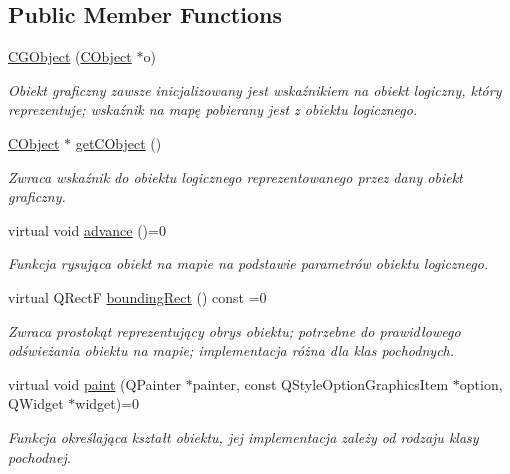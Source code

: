 \subsection*{Public Member Functions}
\begin{DoxyCompactItemize}
\item 
\mbox{\hyperlink{class_c_g_object_a40a7f41342b3b791a8854b3397378d5d}{C\+G\+Object}} (\mbox{\hyperlink{class_c_object}{C\+Object}} $\ast$o)
\begin{DoxyCompactList}\small\item\em Obiekt graficzny zawsze inicjalizowany jest wskaźnikiem na obiekt logiczny, który reprezentuje; wskaźnik na mapę pobierany jest z obiektu logicznego. \end{DoxyCompactList}\item 
\mbox{\hyperlink{class_c_object}{C\+Object}} $\ast$ \mbox{\hyperlink{class_c_g_object_a6e749272ebf5a43d43927cdfed21c46c}{get\+C\+Object}} ()
\begin{DoxyCompactList}\small\item\em Zwraca wskaźnik do obiektu logicznego reprezentowanego przez dany obiekt graficzny. \end{DoxyCompactList}\item 
virtual void \mbox{\hyperlink{class_c_g_object_a859e765fbb3ab0d6ad73ca58e5e49779}{advance}} ()=0
\begin{DoxyCompactList}\small\item\em Funkcja rysująca obiekt na mapie na podstawie parametrów obiektu logicznego. \end{DoxyCompactList}\item 
virtual Q\+RectF \mbox{\hyperlink{class_c_g_object_ab9edf3d10a53c254cdb5d3d8de930207}{bounding\+Rect}} () const =0
\begin{DoxyCompactList}\small\item\em Zwraca prostokąt reprezentujący obrys obiektu; potrzebne do prawidłowego odświeżania obiektu na mapie; implementacja różna dla klas pochodnych. \end{DoxyCompactList}\item 
virtual void \mbox{\hyperlink{class_c_g_object_a9622c313eb09ca5fc0e34f5d2aaac910}{paint}} (Q\+Painter $\ast$painter, const Q\+Style\+Option\+Graphics\+Item $\ast$option, Q\+Widget $\ast$widget)=0
\begin{DoxyCompactList}\small\item\em Funkcja określająca kształt obiektu, jej implementacja zależy od rodzaju klasy pochodnej. \end{DoxyCompactList}\end{DoxyCompactItemize}
